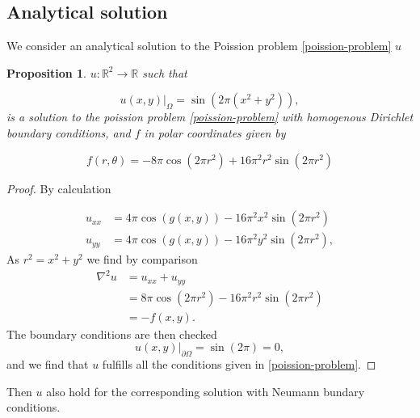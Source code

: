 \documentclass[5pt,a4paper,english]{elsarticle}%
\newcommand{\restr}[2]{\ensuremath{\left.#1\right|_{#2}}}
\newtheorem{proposition}[theorem]{Proposition}
\begin{document}
\subsection{Analytical solution}
We consider an analytical solution to the Poission problem \eqref{poission-problem} $u$
\begin{proposition}\label{prop-analytical-solution}
    $u: \mathbb{R}^2 \rightarrow \mathbb{R}$ such that

    \begin{equation}
    \restr{u(x,y)}{\Omega} = \sin(2\pi (x^2 + y^2)),
    \label{analytical-solution}
    \end{equation}
    is a solution to the poission problem \eqref{poission-problem} with homogenous Dirichlet boundary conditions, and  $f$ in polar coordinates given by

    \begin{equation}
    f(r,\theta) = -8\pi\cos(2\pi r^2) + 16 \pi^2r^2 \sin(2\pi r^2)
    \label{f-analytic}
    \end{equation}
\end{proposition}
\begin{proof}
By calculation

\begin{equation*}
\begin{aligned}
 u_{xx} &= 4\pi\cos(g(x,y)) - 16\pi^2x^2\sin(2\pi r^2)
\\
u_{yy} &= 4\pi\cos(g(x,y)) - 16\pi^2y^2\sin(2\pi r^2),
\end{aligned}
\end{equation*}
As $r^2 = x^2 + y^2$ we find by comparison
\begin{equation*}
\begin{aligned}
\nabla^2 u &= u_{xx} + u_{yy}\\
&= 8\pi \cos(2\pi r^2) - 16\pi^2r^2\sin(2\pi r^2)\\
& = -f(x,y).
\end{aligned}
\end{equation*}
The boundary conditions are then checked
\begin{equation*}
    \restr{u(x,y)}{\partial\Omega} = \sin(2\pi) = 0,
\end{equation*}
and we find that $u$ fulfills all the conditions given in \eqref{poission-problem}. 
\end{proof}
\noindent Then $u$ also hold for the corresponding solution with Neumann bundary conditions. 
\end{document}
